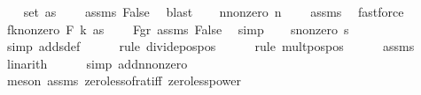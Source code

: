 \begin{isabellebody}
\isanewline
\ \ \isamarkupfalse%
\ {\isachardoublequoteopen}set\ as\ {\isasymnoteq}\ {\isacharbraceleft}{\kern0pt}{\isacharbraceright}{\kern0pt}{\isachardoublequoteclose}\ \isamarkupfalse%
\ assms\ False\ \isamarkupfalse%
\ blast\isanewline
\ \ \isamarkupfalse%
\ n{\isacharunderscore}{\kern0pt}nonzero{\isacharcolon}{\kern0pt}\ {\isachardoublequoteopen}n\ {\isachargreater}{\kern0pt}\ {}{\isachardoublequoteclose}\ \isamarkupfalse%
\ assms{\isacharparenleft}{\kern0pt}{}{\isacharparenright}{\kern0pt}\ \isamarkupfalse%
\ fastforce\isanewline
\isanewline
\ \ \isamarkupfalse%
\ fk{\isacharunderscore}{\kern0pt}nonzero{\isacharcolon}{\kern0pt}\ {\isachardoublequoteopen}F\ k\ as\ {\isachargreater}{\kern0pt}\ {}{\isachardoublequoteclose}\ \isamarkupfalse%
\ F{\isacharunderscore}{\kern0pt}gr{\isacharunderscore}{\kern0pt}{}\ assms\ False\ \isamarkupfalse%
\ simp\isanewline
\isanewline
\ \ \isamarkupfalse%
\ s{}{\isacharunderscore}{\kern0pt}nonzero{\isacharcolon}{\kern0pt}\ {\isachardoublequoteopen}s\ {\isachargreater}{\kern0pt}\ {}{\isachardoublequoteclose}\isanewline
\ \ \ \ \isamarkupfalse%
\ {\isacharparenleft}{\kern0pt}simp\ add{\isacharcolon}{\kern0pt}sdef{\isacharparenright}{\kern0pt}\isanewline
\ \ \ \ \isamarkupfalse%
\ {\isacharparenleft}{\kern0pt}rule\ divide{\isacharunderscore}{\kern0pt}pos{\isacharunderscore}{\kern0pt}pos{\isacharparenright}{\kern0pt}\isanewline
\ \ \ \ \isamarkupfalse%
\ {\isacharparenleft}{\kern0pt}rule\ mult{\isacharunderscore}{\kern0pt}pos{\isacharunderscore}{\kern0pt}pos{\isacharparenright}{\kern0pt}\isanewline
\ \ \ \ \isamarkupfalse%
\ assms\ \isamarkupfalse%
\ linarith\isanewline
\ \ \ \ \isamarkupfalse%
\ {\isacharparenleft}{\kern0pt}simp\ add{\isacharcolon}{\kern0pt}n{\isacharunderscore}{\kern0pt}nonzero{\isacharparenright}{\kern0pt}\isanewline
\ \ \ \ \isamarkupfalse%
\ {\isacharparenleft}{\kern0pt}meson\ assms\ zero{\isacharunderscore}{\kern0pt}less{\isacharunderscore}{\kern0pt}of{\isacharunderscore}{\kern0pt}rat{\isacharunderscore}{\kern0pt}iff\ zero{\isacharunderscore}{\kern0pt}less{\isacharunderscore}{\kern0pt}power{\isacharparenright}{\kern0pt}\isanewline
\ \ \isamarkupfalse%

\end{isabellebody}
